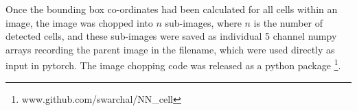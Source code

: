 \documentclass[a4paper,11pt,twoside,openright]{scrbook}
\begin{document}
%

Once the bounding box co-ordinates had been calculated for all cells within an image, the image was chopped into $n$ sub-images, where $n$ is the number of detected cells, and these sub-images were saved as individual 5 channel numpy arrays recording the parent image in the filename, which were used directly as input in pytorch.
The image chopping code was released as a python package \footnote{www.github.com/swarchal/NN\_cell}.

\end{document}
